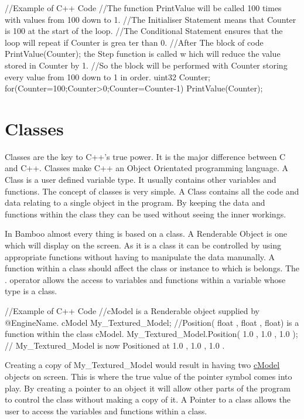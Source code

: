 \begin{DoxyCode}
 //Example of C++ Code
 //The function PrintValue will be called 100 times with values from 100 down to 
      1.
 //The Initialiser Statement means that Counter is 100 at the start of the loop.
 //The Conditional Statement ensures that the loop will repeat if Counter is grea
      ter than 0.
 //After The block of code { PrintValue(Counter); } the Step function is called w
      hich will reduce the value stored in Counter by 1.
 //So the block will be performed with Counter storing every value from 100 down 
      to 1 in order.
 uint32 Counter;
 for(Counter=100;Counter>0;Counter=Counter-1)
 {
        PrintValue(Counter);
 }
\end{DoxyCode}
\hypertarget{_programming_basics_BasicsPageClasses}{}\section{Classes}\label{_programming_basics_BasicsPageClasses}
Classes are the key to C++'s true power. It is the major difference between C and C++. Classes make C++ an Object Orientated programming language. A Class is a user defined variable type. It usually contains other variables and functions. The concept of classes is very simple. A Class contains all the code and data relating to a single object in the program. By keeping the data and functions within the class they can be used without seeing the inner workings. \par
 In Bamboo almost every thing is based on a class. A Renderable Object is one which will display on the screen. As it is a class it can be controlled by using appropriate functions without having to manipulate the data manunally. A function within a class should affect the class or instance to which is belongs. The {\bfseries }. operator allows the access to variables and functions within a variable whose type is a class. 
\begin{DoxyCode}
 //Example of C++ Code
 //cModel is a Renderable object supplied by @EngineName.
 cModel My_Textured_Model;
 //Position( float , float , float) is a function within the class cModel.
 My_Textured_Model.Position( 1.0 , 1.0 , 1.0 );
 // My_Textured_Model is now Positioned at 1.0 , 1.0 , 1.0 .
\end{DoxyCode}
 Creating a copy of My\_\-Textured\_\-Model would result in having two \hyperlink{classc_model}{cModel} objects on screen. This is where the true value of the pointer symbol comes into play. By creating a pointer to an object it will allow other parts of the program to control the class without making a copy of it. A Pointer to a class allows the user to access the variables and functions within a class. 

